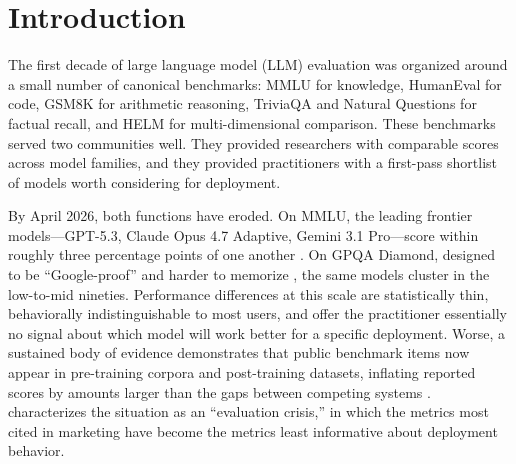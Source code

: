 \documentclass[11pt,a4paper]{article}
\begin{document}
\section{Introduction}
\label{sec:introduction}

The first decade of large language model (LLM) evaluation was organized around a small number of canonical benchmarks: MMLU \citep{hendrycks2021measuring} for knowledge, HumanEval \citep{chen2021evaluating} for code, GSM8K \citep{cobbe2021gsm8k} for arithmetic reasoning, TriviaQA \citep{joshi2017triviaqa} and Natural Questions \citep{kwiatkowski2019natural} for factual recall, and HELM \citep{liang2023holistic} for multi-dimensional comparison. These benchmarks served two communities well. They provided researchers with comparable scores across model families, and they provided practitioners with a first-pass shortlist of models worth considering for deployment.

By April 2026, both functions have eroded. On MMLU, the leading frontier models---GPT-5.3, Claude Opus 4.7 Adaptive, Gemini 3.1 Pro---score within roughly three percentage points of one another \citep{artificialanalysis2026}. On GPQA Diamond, designed to be ``Google-proof'' and harder to memorize \citep{rein2023gpqa}, the same models cluster in the low-to-mid nineties. Performance differences at this scale are statistically thin, behaviorally indistinguishable to most users, and offer the practitioner essentially no signal about which model will work better for a specific deployment. Worse, a sustained body of evidence demonstrates that public benchmark items now appear in pre-training corpora and post-training datasets, inflating reported scores by amounts larger than the gaps between competing systems \citep{sun2024contamination,jacovi2023stop,xu2024benchmark}. \citet{karpathy2025year} characterizes the situation as an ``evaluation crisis,'' in which the metrics most cited in marketing have become the metrics least informative about deployment behavior.
\end{document}
